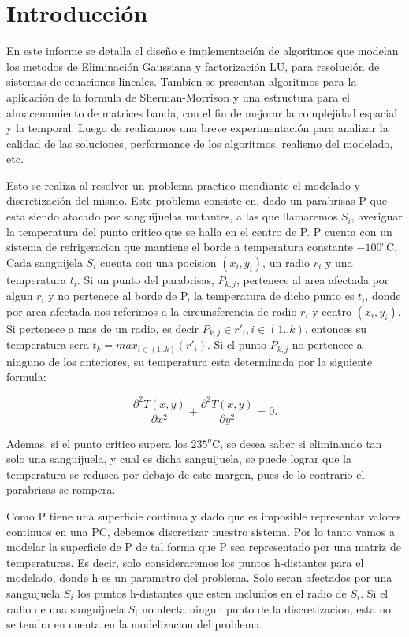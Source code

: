 \section{Introducci\'on}

En este informe se detalla el dise\~no e implementaci\'on de algoritmos que modelan los metodos de Eliminaci\'on Gaussiana y factorizaci\'on LU,
para resoluci\'on de sistemas de ecuaciones lineales. Tambien se presentan algoritmos para la aplicaci\'on de la formula de Sherman-Morrison y
una estructura para el almacenamiento de matrices banda, con el fin de mejorar la complejidad espacial y la temporal. Luego de realizamos una %
breve experimentaci\'on para analizar la calidad de las soluciones, performance de los algoritmos, realismo del modelado, etc.

Esto se realiza al resolver un problema practico mendiante el modelado y discretizaci\'on del mismo. Este problema consiste en, dado un parabrisas 
P que esta siendo atacado por sanguijuelas mutantes, a las que llamaremos $S_i$, averiguar la temperatura del punto critico que se
halla en el centro de P. P cuenta con un sistema de refrigeracion que mantiene el borde a temperatura constante
$-100^o$C. Cada sanguijela $S_i$ cuenta con una pocision $(x_i, y_i)$, un radio $r_i$ y una temperatura $t_i$. Si un punto del
parabrisas, $P_{k,j}$, 
pertenece al area afectada por algun $r_i$ y no pertenece al borde de P, la temperatura de dicho punto es $t_i$, donde por area afectada nos referimos a la circunsferencia de 
radio $r_i $ y centro $(x_i, y_i)$. Si pertenece a mas de un radio, es decir
$P_{k,j} \in {r'_i}, i\in (1..k) $, entonces su temperatura sera 
$t_k=max_{i\in (1..k)}(r'_i) $. Si el punto $P_{k,j}$ no pertenece a ninguno de los anteriores,
su temperatura esta determinada por la siguiente formula:


\begin{equation}\label{eq:calor}
\frac{\partial^2T(x,y)}{\partial x^{2}}+\frac{\partial^2 T(x,y)}{\partial y^{2}} = 0.
\end{equation}

Ademas, si el punto critico supera los $235^o $C, se desea saber si eliminando tan solo una sanguijuela, y cual es dicha sanguijuela,
se puede lograr que la 
temperatura se redusca por debajo de este margen, pues de lo contrario el parabrisas se rompera.

Como P tiene una superficie continua y dado que es imposible representar valores continuos en una PC,
debemos discretizar nuestro sistema. Por lo tanto vamos a modelar la superficie de P de tal forma que P sea representado por una matriz de
temperaturas. Es decir, solo consideraremos los puntos h-distantes para el modelado, donde h es un parametro del problema. 
Solo seran afectados por una sanguijuela $S_i$ los puntos h-distantes que esten incluidos en el radio de $S_i$. Si el radio de una sanguijuela $S_i$ no 
afecta ningun punto de la discretizacion, esta no se tendra en cuenta en la modelizacion del problema. 

